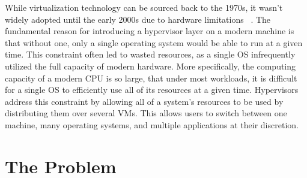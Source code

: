 \documentclass{report}
\begin{document}
\begin{spacing}{1.5}
{\large
\noindent While virtualization technology can be sourced back to the 1970s, it wasn’t widely adopted until the early 2000s due to hardware limitations ~\cite{popek1974formal}. The fundamental reason for introducing a hypervisor layer on a modern machine is that without one, only a single operating system would be able to run at a given time. This constraint often led to wasted resources, as a single OS infrequently utilized the full capacity of modern hardware. More specifically, the computing capacity of a modern CPU is so large, that under most workloads, it is difficult for a single OS to efficiently use all of its resources at a given time. Hypervisors address this constraint by allowing all of a system’s resources to be used by distributing them over several VMs. This allows users to switch between one machine, many operating systems, and multiple applications at their discretion.
\newline
}



\section{The Problem}


\end{spacing}
\end{document}
